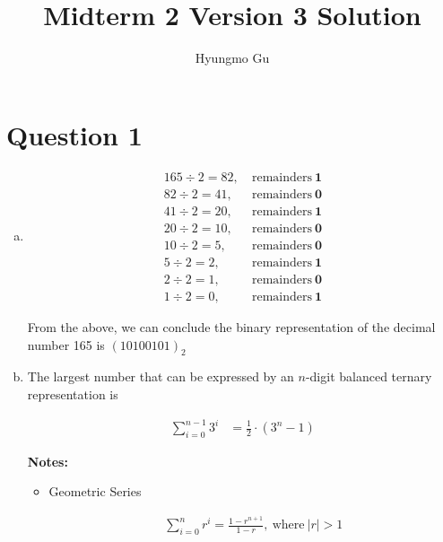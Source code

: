 \documentclass[12pt]{article}
\begin{document}
\title{Midterm 2 Version 3 Solution}
\author{Hyungmo Gu}
\maketitle

\section*{Question 1}
\begin{enumerate}[a.]
    \item

    \begin{align*}
        165 \div 2 = 82,\:&\text{remainders}\:\textbf{1}\\
        82 \div 2 = 41,\:&\text{remainders}\:\textbf{0}\\
        41 \div 2 = 20,\:&\text{remainders}\:\textbf{1}\\
        20 \div 2 = 10,\:&\text{remainders}\:\textbf{0}\\
        10 \div 2 = 5,\:&\text{remainders}\:\textbf{0}\\
        5 \div 2 = 2,\:&\text{remainders}\:\textbf{1}\\
        2 \div 2 = 1,\:&\text{remainders}\:\textbf{0}\\
        1 \div 2 = 0,\:&\text{remainders}\:\textbf{1}
    \end{align*}

    \bigskip

    From the above, we can conclude the binary representation of the decimal
    number 165 is $(10100101)_2$

    \item

    The largest number that can be expressed by an $n$-digit balanced ternary
    representation is

    \begin{align}
        \sum\limits_{i=0}^{n-1} 3^i &= \frac{1}{2} \cdot (3^n - 1)
    \end{align}

    \bigskip

    \textbf{Notes:}

    \begin{itemize}
        \item Geometric Series

        \setcounter{equation}{0}
        \begin{align*}
            \sum\limits_{i=0}^n r^i = \frac{1-r^{n+1}}{1-r},\:\text{where}\:\lvert r \rvert > 1
        \end{align*}
    \end{itemize}


\end{enumerate}
\end{document}
